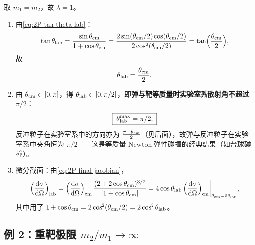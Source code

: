 \begin{example}[等质量碰撞，$\theta_{\rm lab}^{\max}=\pi/2$]\label{ex:2P-equal-mass}
取 $m_1=m_2$，故 $\lambda=1$。
\begin{enumerate}
\item[(a)] 由\eqref{eq:2P-tan-theta-lab}：
\[
  \tan\theta_{\rm lab}
  = \frac{\sin\theta_{\rm cm}}{1+\cos\theta_{\rm cm}}
  = \frac{2\sin(\theta_{\rm cm}/2)\cos(\theta_{\rm cm}/2)}{2\cos^2(\theta_{\rm cm}/2)}
  = \tan\!\Big(\frac{\theta_{\rm cm}}{2}\Big),
\]
故
\begin{equation}
  \theta_{\rm lab} = \frac{\theta_{\rm cm}}{2}.
  \label{eq:2P-equal-mass-half}
\end{equation}
\item[(b)] 由 $\theta_{\rm cm}\in[0,\pi]$，得 $\theta_{\rm lab}\in[0,\pi/2]$，即\textbf{弹与靶等质量时实验室系散射角不超过 $\pi/2$}：
\begin{equation}
  \boxed{\;\theta_{\rm lab}^{\max} = \pi/2.\;}
  \label{eq:2P-equal-mass-max}
\end{equation}
反冲粒子在实验室系中的方向亦为 $\frac{\pi-\theta_{\rm cm}}{2}$（见后面），故弹与反冲粒子在实验室系中夹角恒为 $\pi/2$——这是等质量 Newton 弹性碰撞的经典结果（如台球碰撞）。
\item[(c)] 微分截面：由\eqref{eq:2P-final-jacobian}，
\[
  \Big(\frac{\mathrm{d}\sigma}{\mathrm{d}\Omega}\Big)_{\rm lab}
  = \Big(\frac{\mathrm{d}\sigma}{\mathrm{d}\Omega}\Big)_{\rm cm}\,
    \frac{(2+2\cos\theta_{\rm cm})^{3/2}}{|1+\cos\theta_{\rm cm}|}
  = 4\cos\theta_{\rm lab}\,\Big(\frac{\mathrm{d}\sigma}{\mathrm{d}\Omega}\Big)_{\rm cm}\bigg|_{\theta_{\rm cm}=2\theta_{\rm lab}},
\]
其中用了 $1+\cos\theta_{\rm cm}=2\cos^2(\theta_{\rm cm}/2)=2\cos^2\theta_{\rm lab}$。
\end{enumerate}
\end{example}

\subsection{例 2：重靶极限 $m_2/m_1\to\infty$}

